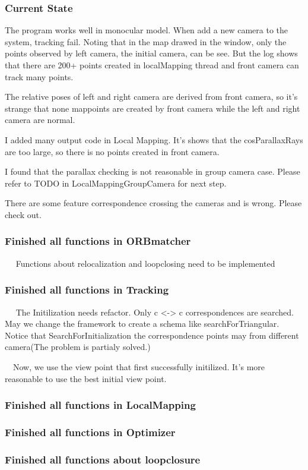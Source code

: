 \documentclass{beamer}
\begin{document}
\begin{frame}
\frametitle {Current State}
The program works well in monocular model. When add a new camera to the system, tracking fail. Noting that in the map drawed in the window, only the points observed by left camera, the initial camera, can be see. But the log shows that there are 200+ points created in localMapping thread and front camera can track many points.


The relative poses of left and right camera are derived from front camera, so it's strange that none mappoints are created by front camera while the left and right camera are normal.

I added many output code in Local Mapping. It's shows that the cosParallaxRays are too large, so there is no points created in front camera.

I found that the parallax checking is not reasonable in group camera case. Please refer to TODO in LocalMappingGroupCamera for next step.

There are some feature correspondence crossing the cameras and is wrong. Please check out.
\frametitle {Finished all functions in ORBmatcher}
\item $\quad$ Functions about relocalization and loopclosing need to be implemented 

\frametitle {Finished all functions in Tracking}
\item $\quad$ The Initilization needs refactor. Only c <-> c correspondences are searched. May we change the framework to create a schema like searchForTriangular. Notice that SearchForInitialization the correspondence points may from different camera(The problem is partialy solved.)
\item $\quad$Now, we use the view point that first successfully initilized. It's more reasonable to use the best initial view point.
\frametitle {Finished all functions in LocalMapping}

\frametitle {Finished all functions in Optimizer}
\frametitle {Finished all functions about loopclosure}

\end{frame}
\end{document}

